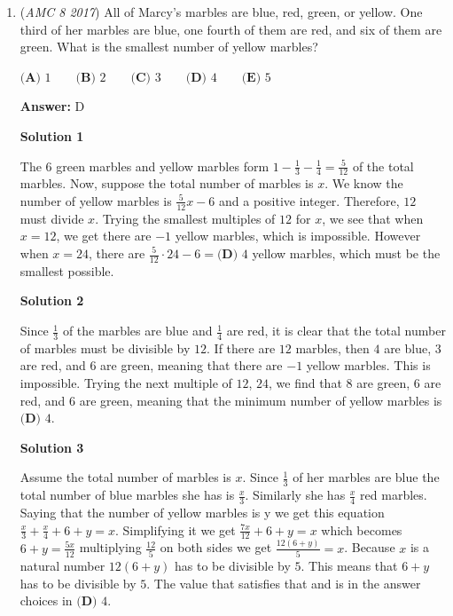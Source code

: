 \begin{enumerate}
	\item (\textit{AMC 8 2017}) All of Marcy's marbles are blue, red, green, or yellow. One third of her marbles are blue, one fourth of them are red, and six of them are green. What is the smallest number of yellow marbles?


 $\textbf{(A) }1\qquad\textbf{(B) }2\qquad\textbf{(C) }3\qquad\textbf{(D) }4\qquad\textbf{(E) }5$

 \textbf{Answer: }D



\textbf{Solution 1}

The $6$ green marbles and yellow marbles form $1 - \frac{1}{3} - \frac{1}{4} = \frac{5}{12}$ of the total marbles. Now, suppose the total number of marbles is $x$. We know the number of yellow marbles is $\frac{5}{12}x - 6$ and a positive integer. Therefore, $12$ must divide $x$. Trying the smallest multiples of $12$ for $x$, we see that when $x = 12$, we get there are $-1$ yellow marbles, which is impossible. However when $x = 24$, there are $\frac{5}{12} \cdot 24 - 6 = \boxed{\textbf{(D) }4}$ yellow marbles, which must be the smallest possible.

 



\textbf{Solution 2}

Since $\frac{1}{3}$ of the marbles are blue and $\frac{1}{4}$ are red, it is clear that the total number of marbles must be divisible by $12$. If there are $12$ marbles, then $4$ are blue, $3$ are red, and $6$ are green, meaning that there are $-1$ yellow marbles. This is impossible. Trying the next multiple of $12$, $24$, we find that $8$ are green, $6$ are red, and $6$ are green, meaning that the minimum number of yellow marbles is $\boxed{\textbf{(D) }4}$.

 



\textbf{Solution 3}

Assume the total number of marbles is $x$. Since $\frac{1}{3}$ of her marbles are blue the total number of blue marbles she has is $\frac{x}{3}$. Similarly she has $\frac{x}{4}$ red marbles. Saying that the number of yellow marbles is y we get this equation $\frac{x}{3}+\frac{x}{4}+6+y=x$. Simplifying it we get $\frac{7x}{12}+6+y=x$ which becomes $6+y=\frac{5x}{12}$ multiplying $\frac{12}{5}$ on both sides we get $\frac{12(6+y)}{5}=x$. Because $x$ is a natural number $12(6+y)$ has to be divisible by $5$. This means that $6+y$ has to be divisible by $5$. The value that satisfies that and is in the answer choices in $\boxed{\textbf{(D) }4}$.


\end{enumerate}
